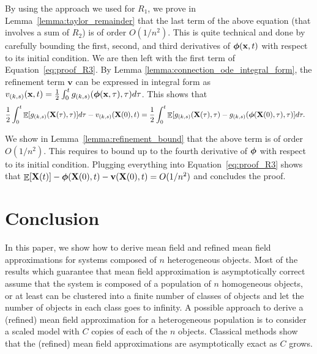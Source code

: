 \documentclass[acmsmall]{acmart}
\newcommand\bx{\mathbf{x}}
\newcommand\bX{\mathbf{X}}
\newcommand\bv{\mathbf{v}}
\newcommand\bphi{\text{\boldmath$\phi$}}
\DeclareMathOperator{\E}{\mathbb{E}} %
\begin{document}
By using the approach we used for $R_1$, we prove in Lemma~\ref{lemma:taylor_remainder} that the last term of the above equation (that involves a sum of $R_2$) is of order $O(1/n^2)$. This is quite technical and done by carefully bounding the first, second, and third derivatives of $\bphi(\bx,t)$ with respect to its initial condition. We are then left with the first term of Equation~\eqref{eq:proof_R3}. By Lemma \ref{lemma:connection_ode_integral_form}, the refinement term $\bv$ can be expressed in integral form as $v_{(k,s)}(\bx, t) = \frac{1}{2}\int_0^t g_{(k,s)}(\bphi(\bx, \tau), \tau) d\tau$. This shows that
\begin{align*}
  \frac{1}{2} \int_0^t \E [g_{(k,s)}(\bX(\tau),\tau)]d\tau- v_{(k,s)}(\bX(0), t)&=\frac{1}{2} \int_0^t \E [g_{(k,s)}(\bX(\tau),\tau)- g_{(k,s)}(\bphi(\bX(0), \tau),\tau)]d\tau.
\end{align*}

We show in Lemma~\ref{lemma:refinement_bound} that the above term is of order $O(1/n^2)$. This requires to bound up to the fourth derivative of $\bphi$ with respect to its initial condition. Plugging everything into Equation~\eqref{eq:proof_R3} shows that $\E[\bX(t)] - \bphi(\bX(0),t) - \bv(\bX(0),t) = O(1/n^2)$ and concludes the proof.


\section{Conclusion}
\label{sec:conclusion}

In this paper, we show how to derive mean field and refined mean field approximations for systems composed of $n$ heterogeneous objects. Most of the results which guarantee that mean field approximation is asymptotically correct assume that the system is composed of a population of $n$ homogeneous objects, or at least can be clustered into a finite number of classes of objects and let the number of objects in each class goes to infinity. A possible approach to derive a (refined) mean field approximation for a heterogeneous population is to consider a scaled model with $C$ copies of each of the $n$ objects. Classical methods show that the (refined) mean field approximations are asymptotically exact as $C$ grows.
\end{document}
